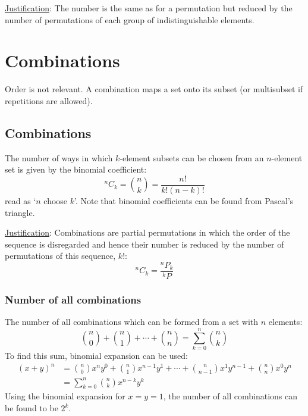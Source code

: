 \documentclass{article}
\begin{document}
\underline{Justification}:
The number is the same as for a permutation but reduced by the number of permutations of each group of indistinguishable elements.


\section{Combinations}

Order is not relevant.
A combination maps a set onto its subset (or multisubset if repetitions are allowed).

\subsection{Combinations}
\label{combinations}

The number of ways in which $k$\nobreakdash-\hspace{0pt}element subsets can be chosen from an $n$\nobreakdash-\hspace{0pt}element set is given by the binomial coefficient:
%
\begin{equation}
    ^nC_k = \binom{n}{k} = \frac{n!}{k!(n-k)!}
\end{equation}
%
read as `$n$ choose $k$'.
Note that binomial coefficients can be found from Pascal's triangle.

\underline{Justification}:
Combinations are partial permutations in which the order of the sequence is disregarded and hence their number is reduced by the number of permutations of this sequence, $k!$:
%
\begin{equation}
        ^nC_k = \frac{^nP_k}{^kP}
\end{equation}

\subsubsection{Number of all combinations}

The number of all combinations which can be formed from a set with $n$ elements:
%
\begin{equation}
    \label{eq:all_comb}
    \binom{n}{0} + \binom{n}{1} + \dotsb + \binom{n}{n}= \sum_{k=0}^{n} \binom{n}{k}
\end{equation}
%
To find this sum, binomial expansion can be used:
%
\begin{equation}
    \begin{split}
        (x+y)^n & = \binom{n}{0} x^n y^0 + \binom{n}{1} x^{n-1} y^1 + \dotsb + \binom{n}{n-1} x^1 y^{n-1} + \binom{n}{n} x^0 y^n \\
                & = \sum_{k=0}^{n} \binom{n}{k} x^{n-k} y^k
    \end{split}
\end{equation}
%
Using the binomial expansion for $x=y=1$, the number of all combinations can be found to be $2^k$.
\end{document}
